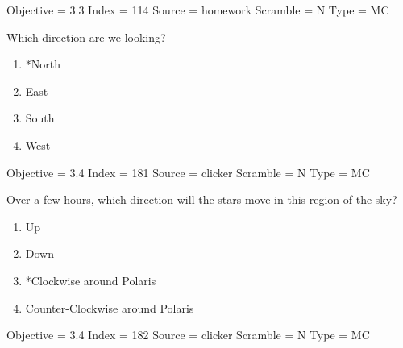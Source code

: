 \documentclass[11pt]{article}
\begin{document}
\begin{enumerate}
\begin{minipage}{\textwidth}
\begin{minipage}{\textwidth}
Objective = 3.3
Index = 114
Source = homework
Scramble = N
Type = MC
\end{minipage}
\end{minipage}
\vskip 0.20in

\begin{minipage}{\textwidth}
\begin{minipage}{\textwidth}
\item Which direction are we looking?
\begin{multicols}{3}
\begin{enumerate} 
\setlength{\itemsep}{1pt} 
\setlength{\parskip}{0pt} 
\setlength{\parsep}{0pt}
\setlength{\multicolsep}{1pt} 
\item *North
\item East
\item South
\item West
\end{enumerate} 
\vfill 
\end{multicols}

Objective = 3.4
Index = 181
Source = clicker
Scramble = N
Type = MC
\end{minipage}
\end{minipage}
\vskip 0.20in

\begin{minipage}{\textwidth}
\begin{minipage}{\textwidth}
\item Over a few hours, which direction will the stars move in this region of the sky?
\begin{multicols}{2}
\begin{enumerate} 
\setlength{\itemsep}{1pt} 
\setlength{\parskip}{0pt} 
\setlength{\parsep}{0pt}
\setlength{\multicolsep}{1pt} 
\item Up
\item Down
\item *Clockwise around Polaris
\item Counter-Clockwise around Polaris
\end{enumerate} 
\vfill 
\end{multicols}

Objective = 3.4
Index = 182
Source = clicker
Scramble = N
Type = MC
\end{minipage}
\end{minipage}
\vskip 0.20in


\end{enumerate}
\end{document}
